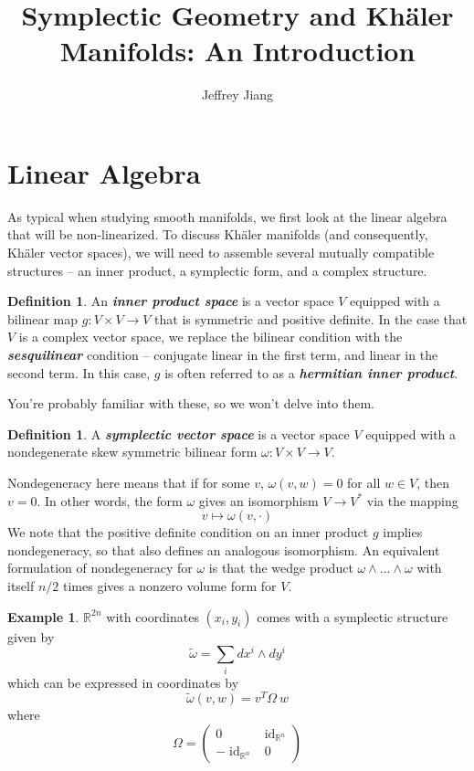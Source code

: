 \documentclass[psamsfonts]{amsart}
\theoremstyle{definition}
\newtheorem{defn}[thm]{Definition}
\newtheorem{exmp}[thm]{Example}
\theoremstyle{remark}
\newcommand{\R}{\mathbb{R}}
\newcommand{\ib}[1]{\textbf{\textit{#1}}}
\DeclareMathOperator{\id}{id}
\begin{document}
\author{Jeffrey Jiang}
\title{Symplectic Geometry and Kh\"aler Manifolds: An Introduction}
%
\maketitle
%
\section*{Linear Algebra}
%
As typical when studying smooth manifolds, we first look at the linear algebra that will be non-linearized. To discuss Kh\"aler manifolds (and consequently, Kh\"aler vector spaces), we will need to assemble several mutually compatible structures -- an inner product, a symplectic form, and a complex structure. 
%
\begin{defn}
An \ib{inner product space} is a vector space $V$ equipped with a bilinear map $g: V\times V \to V$ that is symmetric and positive definite. In the case that $V$ is a complex vector space, we replace the bilinear condition with the \ib{sesquilinear} condition -- conjugate linear in the first term, and linear in the second term. In this case, $g$ is often referred to as a \ib{hermitian inner product}.
\end{defn}
You're probably familiar with these, so we won't delve into them.
%
\begin{defn}
A \ib{symplectic vector space} is a vector space $V$ equipped with a nondegenerate skew symmetric bilinear form $\omega : V \times V \to V$.
\end{defn}
%
Nondegeneracy here means that if for some $v$, $\omega(v,w) = 0$ for all $w \in V$, then $v = 0$.  In other words, the form $\omega$ gives an isomorphism $V \to V^*$ via the mapping
$$v \mapsto \omega(v,\cdot) $$
We note that the positive definite condition on an inner product $g$ implies nondegeneracy, so that also defines an analogous isomorphism. An equivalent formulation of nondegeneracy for $\omega$ is that the wedge product $\omega \wedge \ldots \wedge \omega$ with itself $n/2$ times gives a nonzero volume form for $V$.
\begin{exmp}
$\R^{2n}$ with coordinates $(x_i,y_i)$ comes with a symplectic structure given by
$$\tilde{\omega} = \sum_i dx^i \wedge dy^i  $$
which can be expressed in coordinates by 
$$\tilde{\omega}(v,w) = v^T \Omega ~w $$
where 
$$\Omega =  \begin{pmatrix}
0 & \id_{\R^n} \\
-\id_{\R^n} & 0
\end{pmatrix} $$
\end{exmp}
\end{document}
